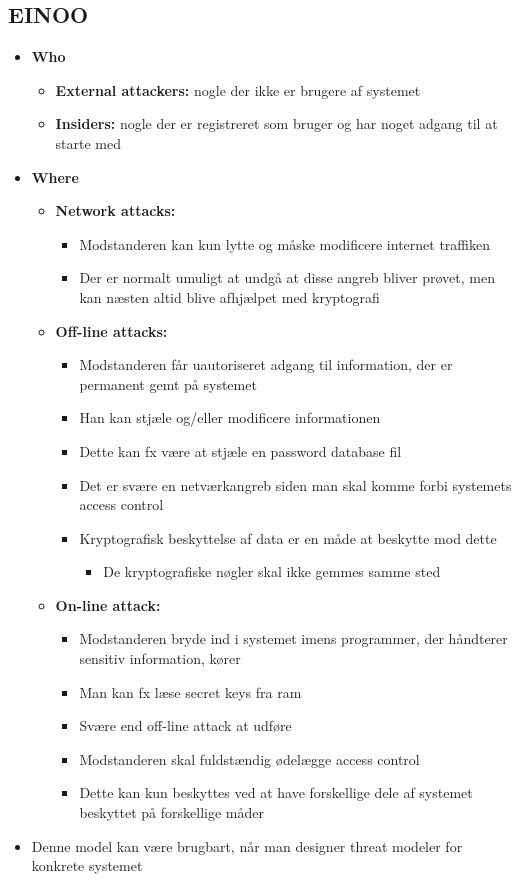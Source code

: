 \documentclass[a4, english]{article}
\begin{document}
\subsection{EINOO}
\begin{itemize}
	\item \textbf{Who} 
  \begin{itemize}
  	\item \textbf{External attackers:} nogle der ikke er brugere af systemet
    \item \textbf{Insiders:} nogle der er registreret som bruger og har noget adgang til at starte med
  \end{itemize}
  \item \textbf{Where} 
  \begin{itemize}
  	\item \textbf{Network attacks:}
    \begin{itemize}
    	\item Modstanderen kan kun lytte og måske modificere internet traffiken
      \item Der er normalt umuligt at undgå at disse angreb bliver prøvet, men kan næsten altid blive afhjælpet med kryptografi   
    \end{itemize}
    \item \textbf{Off-line attacks:}
    \begin{itemize}
    	\item Modstanderen får uautoriseret adgang til information, der er permanent gemt på systemet  
      \item Han kan stjæle og/eller modificere informationen 
      \item Dette kan fx være at stjæle en password database fil
      \item Det er svære en netværkangreb siden man skal komme forbi systemets access control  
      \item Kryptografisk beskyttelse af data er en måde at beskytte mod dette 
      \begin{itemize}
      	\item De kryptografiske nøgler skal ikke gemmes samme sted
      \end{itemize}
    \end{itemize}
    \item \textbf{On-line attack:}
    \begin{itemize}
    	\item Modstanderen bryde ind i systemet imens programmer, der håndterer sensitiv information, kører    
      \item Man kan fx læse secret keys fra ram
      \item Svære end off-line attack at udføre
      \item Modstanderen skal fuldstændig ødelægge access control
      \item Dette kan kun beskyttes ved at have forskellige dele af systemet beskyttet på forskellige måder 
    \end{itemize}
  \end{itemize}
  \item Denne model kan være brugbart, når man designer threat modeler for konkrete systemet  
\end{itemize} 
\end{document}
